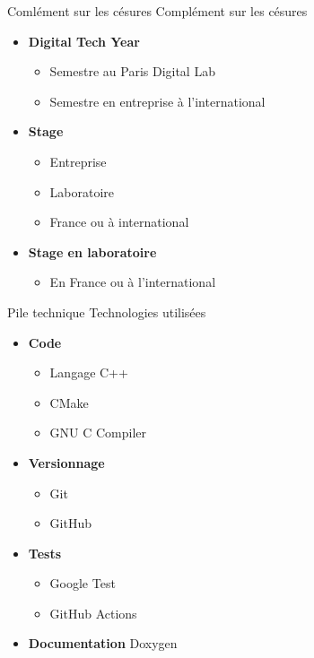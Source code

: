 \documentclass[french, 12pt]{beamer}
\begin{document}
\begin{frame}{Comlément sur les césures}
Complément sur les césures
\begin{itemize}
    \item \textbf{Digital Tech Year}
    \begin{itemize}
        \item Semestre au Paris Digital Lab
        \item Semestre en entreprise à l'international
    \end{itemize}
    \item \textbf{Stage}
    \begin{itemize}
        \item Entreprise
        \item Laboratoire
        \item France ou à international
    \end{itemize}
    \item \textbf{Stage en laboratoire}
    \begin{itemize}
        \item En France ou à l'international
    \end{itemize}
\end{itemize}
\end{frame}

\begin{frame}{Pile technique}
Technologies utilisées
\begin{itemize}
    \item \textbf{Code}
    \begin{itemize}
        \item Langage C++
        \item CMake
        \item GNU C Compiler
    \end{itemize}
    \item \textbf{Versionnage}
    \begin{itemize}
        \item Git
        \item GitHub
    \end{itemize}
    \item \textbf{Tests}
    \begin{itemize}
        \item Google Test
        \item GitHub Actions
    \end{itemize}
    \item \textbf{Documentation} Doxygen
\end{itemize}
\end{frame}
\end{document}
